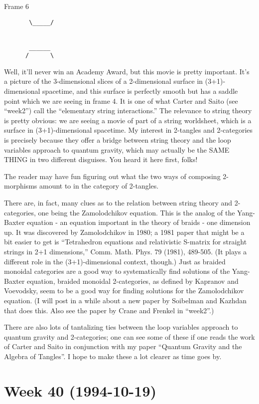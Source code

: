 \documentclass{article}
\begin{document}
Frame 6

\begin{verbatim}
       \_____/
      
      
       ______     
      /      \
\end{verbatim}

Well, it'll never win an Academy Award, but this movie is pretty
important. It's a picture of the 3-dimensional slices of a 2-dimensional
surface in (3+1)-dimensional spacetime, and this surface is perfectly
smooth but has a saddle point which we are seeing in frame 4. It is one
of what Carter and Saito (see ``week2'') call the ``elementary string
interactions.'' The relevance to string theory is pretty obvious: we are
seeing a movie of part of a string worldsheet, which is a surface in
(3+1)-dimensional spacetime. My interest in 2-tangles and 2-categories
is precisely because they offer a bridge between string theory and the
loop variables approach to quantum gravity, which may actually be the
SAME THING in two different disguises. You heard it here first, folks!

The reader may have fun figuring out what the two ways of composing
2-morphisms amount to in the category of 2-tangles.

There are, in fact, many clues as to the relation between string theory
and 2-categories, one being the Zamolodchikov equation. This is the
analog of the Yang-Baxter equation - an equation important in the theory
of braids - one dimension up. It was discovered by Zamolodchikov in
1980; a 1981 paper that might be a bit easier to get is ``Tetrahedron
equations and relativistic S-matrix for straight strings in 2+1
dimensions,'' Comm. Math. Phys. 79 (1981), 489-505. (It plays a
different role in the (3+1)-dimensional context, though.) Just as
braided monoidal categories are a good way to systematically find
solutions of the Yang-Baxter equation, braided monoidal 2-categories, as
defined by Kapranov and Voevodsky, seem to be a good way for finding
solutions for the Zamolodchikov equation. (I will post in a while about
a new paper by Soibelman and Kazhdan that does this. Also see the paper
by Crane and Frenkel in ``week2''.)

There are also lots of tantalizing ties between the loop variables
approach to quantum gravity and 2-categories; one can see some of these
if one reads the work of Carter and Saito in conjunction with my paper
``Quantum Gravity and the Algebra of Tangles''. I hope to make these a
lot clearer as time goes by.
\hypertarget{week-40-1994-10-19}{%
\section{Week 40 (1994-10-19)}\label{week-40-1994-10-19}}
\end{document}
